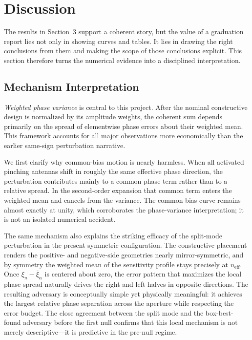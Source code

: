 \section{Discussion}

The results in Section~3 support a coherent story, but the value of a graduation report lies not only in showing curves and tables. It lies in drawing the right conclusions from them and making the scope of those conclusions explicit. This section therefore turns the numerical evidence into a disciplined interpretation.

\subsection{Mechanism Interpretation}

\emph{Weighted phase variance} is central to this project. After the nominal constructive design is normalized by its amplitude weights, the coherent sum depends primarily on the spread of elementwise phase errors about their weighted mean. This framework accounts for all major observations more economically than the earlier same-sign perturbation narrative.

We first clarify why common-bias motion is nearly harmless. When all activated pinching antennas shift in roughly the same effective phase direction, the perturbation contributes mainly to a common phase term rather than to a relative spread. In the second-order expansion that common term enters the weighted mean and cancels from the variance. The common-bias curve remains almost exactly at unity, which corroborates the phase-variance interpretation; it is not an isolated numerical accident.

The same mechanism also explains the striking efficacy of the split-mode perturbation in the present symmetric configuration. The constructive placement renders the positive- and negative-side geometries nearly mirror-symmetric, and by symmetry the weighted mean of the sensitivity profile stays precisely at \(n_{\mathrm{eff}}\). Once \(\xi_n - \bar{\xi}_\alpha\) is centered about zero, the error pattern that maximizes the local phase spread naturally drives the right and left halves in opposite directions. The resulting adversary is conceptually simple yet physically meaningful: it achieves the largest relative phase separation across the aperture while respecting the error budget. The close agreement between the split mode and the box-best-found adversary before the first null confirms that this local mechanism is not merely descriptive—it is predictive in the pre-null regime.

